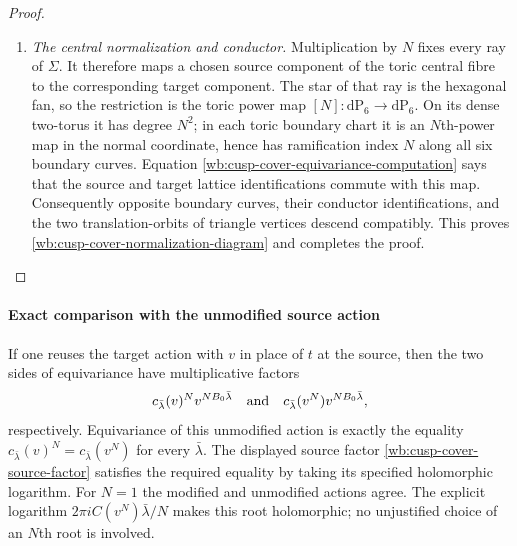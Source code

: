\begin{proof}
\begin{enumerate}[label=\arabic*.,leftmargin=*]
\item \medskip\noindent
\emph{The central normalization and conductor.}
Multiplication by $N$ fixes every ray of $\Sigma$.  It therefore maps a
chosen source component of the toric central fibre to the corresponding
target component.  The star of that ray is the hexagonal fan, so the
restriction is the toric power map
$[N]\colon\mathrm{dP}_6\to\mathrm{dP}_6$.  On its dense two-torus it has
degree $N^2$; in each toric boundary chart it is an $N$th-power map in the
normal coordinate, hence has ramification index $N$ along all six boundary
curves.  Equation \eqref{wb:cusp-cover-equivariance-computation} says that
the source and target lattice identifications commute with this map.
Consequently opposite boundary curves, their conductor identifications,
and the two translation-orbits of triangle vertices descend compatibly.
This proves \eqref{wb:cusp-cover-normalization-diagram} and completes the
proof.
\end{enumerate}
\end{proof}


\paragraph{Exact comparison with the unmodified source action}
\label{wb:cusp-cover-naive-action-failure}

If one reuses the target action with $v$ in place of $t$ at the source,
then the two sides of equivariance have multiplicative factors
\[
 c_{\bar\lambda}(v)^N v^{NB_0\bar\lambda}
 \quad\hbox{and}\quad
 c_{\bar\lambda}(v^N)v^{NB_0\bar\lambda},
\]
respectively. Equivariance of this unmodified action is exactly the equality $c_{\bar\lambda}(v)^N=c_{\bar\lambda}(v^N)$ for every $\bar\lambda$. The displayed source factor \eqref{wb:cusp-cover-source-factor} satisfies the required equality by taking its specified holomorphic logarithm. For $N=1$ the modified and unmodified actions agree. The explicit
logarithm $2\pi iC(v^N)\bar\lambda/N$ makes this root holomorphic; no
unjustified choice of an $N$th root is involved.






